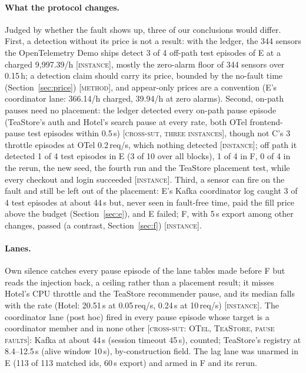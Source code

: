\documentclass{ceurart}
\newcommand{\scope}[1]{\textsc{[#1]}}
\begin{document}
\paragraph{What the protocol changes.} Judged by whether the fault shows up, three of our conclusions would differ.
First, a detection without its price is not a result: with the ledger, the 344 sensors the OpenTelemetry Demo ships detect 3
of 4 off-path test episodes of E at a charged 9,997.39/h \scope{instance}, mostly the zero-alarm floor of 344 sensors
over 0.15\,h; a detection claim should carry its price, bounded by the no-fault
time (Section~\ref{sec:price}) \scope{method}, and appear-only prices are a convention (E's coordinator lane: 366.14/h
charged, 39.94/h at zero alarms). Second, on-path pauses need no placement: the ledger detected every on-path pause episode
(TeaStore's auth and Hotel's search pause at every rate, both OTel frontend-pause test episodes within 0.5\,s)
\scope{cross-sut, three instances}, though not C's 3 throttle episodes at OTel 0.2\,req/s, which nothing detected
\scope{instance}; off path it detected 1 of 4 test episodes in E (3 of 10 over all blocks), 1 of 4 in F, 0 of 4 in the
rerun, the new seed, the fourth run and the TeaStore placement test, while every checkout and login succeeded \scope{instance}.
Third, a sensor can fire on the fault and still be left out of the placement: E's Kafka coordinator log caught 3 of 4 test
episodes at about 44\,s but, never seen in fault-free time, paid the fill price above the budget (Section~\ref{sec:e}),
and E failed; F, with 5\,s export among other changes, passed (a contrast, Section~\ref{sec:f}) \scope{instance}.

\paragraph{Lanes.} Own silence catches every pause episode of the lane tables made before F but reads the injection
back, a ceiling rather than a placement result; it misses Hotel's CPU throttle and the TeaStore recommender pause, and its
median falls with the rate (Hotel: 20.51\,s at 0.05\,req/s, 0.24\,s at 10\,req/s) \scope{instance}. The coordinator lane (post hoc) fired in every pause episode whose target is a coordinator
member and in none other \scope{cross-sut: OTel, TeaStore, pause faults}: Kafka at about 44\,s (session timeout 45\,s),
counted; TeaStore's registry at 8.4--12.5\,s (alive window 10\,s), by-construction field. The lag lane was unarmed in E (113
of 113 matched ids, 60\,s export) and armed in F and its rerun.
\end{document}

